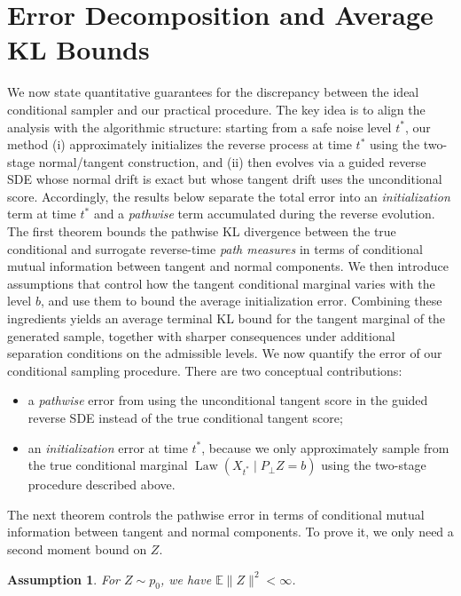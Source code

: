 \documentclass[twoside,11pt]{article}
\newcommand{\E}{\mathbb{E}}
\newcommand{\Law}{\operatorname{Law}}
\numberwithin{equation}{section}
\newtheorem{assumption}{Assumption}[section]
\begin{document}
\section{Error Decomposition and Average KL Bounds}\label{sec:theory}
We now state quantitative guarantees for the discrepancy between the ideal conditional sampler and our practical
procedure. The key idea is to align the analysis with the algorithmic structure: starting from a safe noise level
\(t^*\), our method (i) approximately initializes the reverse process at time \(t^*\) using the two-stage normal/tangent
construction, and (ii) then evolves via a guided reverse SDE whose normal drift is exact but whose tangent drift uses
the unconditional score. Accordingly, the results below separate the total error into an \emph{initialization} term at
time \(t^*\) and a \emph{pathwise} term accumulated during the reverse evolution. The first theorem bounds the pathwise
KL divergence between the true conditional and surrogate reverse-time \emph{path measures} in terms of conditional mutual
information between tangent and normal components. We then introduce assumptions that control how the tangent
conditional marginal varies with the level \(b\), and use them to bound the average initialization error. Combining
these ingredients yields an average terminal KL bound for the tangent marginal of the generated sample, together with
sharper consequences under additional separation conditions on the admissible levels.
We now quantify the error of our conditional sampling procedure. There are two
conceptual contributions:

\begin{itemize}
\item[(i)] a \emph{pathwise} error from using the unconditional tangent score
in the guided reverse SDE instead of the true conditional tangent score;
\item[(ii)] an \emph{initialization} error at time $t^*$, because we only
approximately sample from the true conditional marginal $\Law(X_{t^*}\mid P_{\perp}Z =b)$ using the two-stage procedure described above.
\end{itemize}

The next theorem controls the pathwise error in terms of conditional mutual
information between tangent and normal components. To prove it, we only need a second moment bound on $Z$. 


\begin{assumption}\label{assumption0}
For $Z\sim p_0$, we have $\E\|Z\|^2<\infty$.
\end{assumption}
\end{document}
